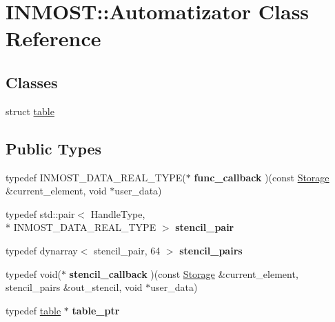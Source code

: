 \hypertarget{classINMOST_1_1Automatizator}{\section{I\-N\-M\-O\-S\-T\-:\-:Automatizator Class Reference}
\label{classINMOST_1_1Automatizator}
}
\subsection*{Classes}
\begin{DoxyCompactItemize}
\item 
struct \hyperlink{structINMOST_1_1Automatizator_1_1table}{table}
\end{DoxyCompactItemize}
\subsection*{Public Types}
\begin{DoxyCompactItemize}
\item 
\hypertarget{classINMOST_1_1Automatizator_a0f03e8ab9f71de728a1faf11fbd88601}{typedef I\-N\-M\-O\-S\-T\-\_\-\-D\-A\-T\-A\-\_\-\-R\-E\-A\-L\-\_\-\-T\-Y\-P\-E($\ast$ {\bfseries func\-\_\-callback} )(const \hyperlink{classINMOST_1_1Storage}{Storage} \&current\-\_\-element, void $\ast$user\-\_\-data)}\label{classINMOST_1_1Automatizator_a0f03e8ab9f71de728a1faf11fbd88601}

\item 
\hypertarget{classINMOST_1_1Automatizator_a9d453cded108f8d7e75697e3cd8adb35}{typedef std\-::pair$<$ Handle\-Type, \\*
I\-N\-M\-O\-S\-T\-\_\-\-D\-A\-T\-A\-\_\-\-R\-E\-A\-L\-\_\-\-T\-Y\-P\-E $>$ {\bfseries stencil\-\_\-pair}}\label{classINMOST_1_1Automatizator_a9d453cded108f8d7e75697e3cd8adb35}

\item 
\hypertarget{classINMOST_1_1Automatizator_ade53cb1323f26ba72c3c374a412b8389}{typedef dynarray$<$ stencil\-\_\-pair, 64 $>$ {\bfseries stencil\-\_\-pairs}}\label{classINMOST_1_1Automatizator_ade53cb1323f26ba72c3c374a412b8389}

\item 
\hypertarget{classINMOST_1_1Automatizator_a2623b5a8a2b68c7aaebfbcf7744050d9}{typedef void($\ast$ {\bfseries stencil\-\_\-callback} )(const \hyperlink{classINMOST_1_1Storage}{Storage} \&current\-\_\-element, stencil\-\_\-pairs \&out\-\_\-stencil, void $\ast$user\-\_\-data)}\label{classINMOST_1_1Automatizator_a2623b5a8a2b68c7aaebfbcf7744050d9}

\item 
\hypertarget{classINMOST_1_1Automatizator_a2179b2fc110400e492a0d4167ff27491}{typedef \hyperlink{structINMOST_1_1Automatizator_1_1table}{table} $\ast$ {\bfseries table\-\_\-ptr}}\label{classINMOST_1_1Automatizator_a2179b2fc110400e492a0d4167ff27491}

\end{DoxyCompactItemize}
